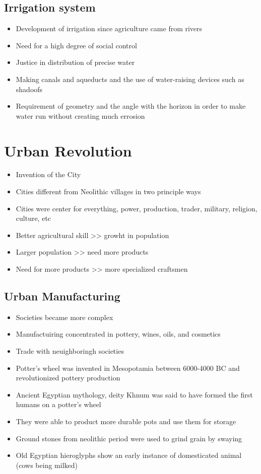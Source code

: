 \documentclass{article}
\begin{document}
\subsection{Irrigation system}
\begin{itemize}
  \item Development of irrigation since agriculture came from rivers
  \item Need for a high degree of social control
  \item Justice in distribution of precise water
  \item Making canals and aqueducts and the use of water-raising devices such as shadoofs
  \item Requirement of geometry and the angle with the horizon in order to make
    water run without creating much errosion
\end{itemize}

\section{Urban Revolution}
\begin{itemize}
  \item Invention of the City
  \item Cities different from Neolithic villages in two principle ways
  \item Cities were center for everything, power, production, trader, military, religion, culture, etc
  \item Better agricultural skill >> growht in population
  \item Larger population >> need more products
  \item Need for more products >> more specialized craftsmen
\end{itemize}

\subsection{Urban Manufacturing}
\begin{itemize}
  \item Societies became more complex
  \item Manufactuiring concentrated in pottery, wines, oils, and cosmetics
  \item Trade with neuighboringh societies
  \item Potter's wheel was invented in Mesopotamia between 6000-4000 BC and
    revolutionized pottery production
  \item Ancient Egyptian mythology, deity Khnum was said to have formed the first humans on a potter's wheel
  \item They were able to product more durable pots and use them for storage
  \item Ground stones from neolithic period were used to grind grain by swaying
  \item Old Egyptian hieroglyphs show an early instance of domesticated animal (cows being milked)
\end{itemize}
\end{document}
